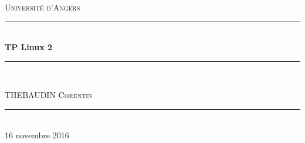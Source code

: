 \documentclass[a4paper,12pt]{article}
\newcommand{\HRule}{\rule{\linewidth}{0.5mm}}
\begin{document}
\begin{titlepage}
  \begin{sffamily}
  \begin{center}


    \textsc{\LARGE Université d'Angers}\\[2cm]

   

    \HRule \\[0.4cm]
    { \huge \bfseries TP Linux 2}
    \HRule \\[2cm]
    

    \begin{minipage}{0.4\textwidth}
      \begin{flushleft} \large
        THEBAUDIN \textsc{Corentin}\\
      \end{flushleft}
    \end{minipage}
    

    \vfill
    \HRule\\[2cm]
    {\large 16 novembre 2016}

  \end{center}
  \end{sffamily}
\end{titlepage}
\clearpage

\tableofcontents

\clearpage



\section{}
\paragraph{}

\clearpage
\end{document}
